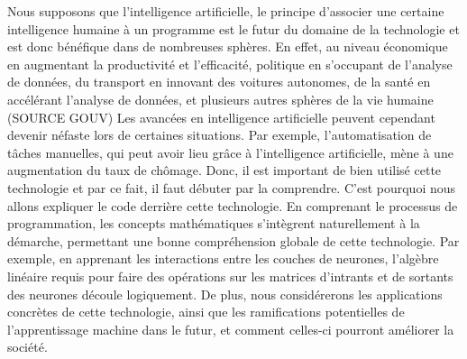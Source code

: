 Nous supposons que l’intelligence artificielle, le principe d’associer une certaine intelligence 
humaine à un programme est le futur du domaine de la technologie et est donc bénéfique dans de nombreuses
sphères. En effet, au niveau économique en augmentant la productivité et l’efficacité, politique en s’occupant
de l’analyse de données, du transport en innovant des voitures autonomes, de la santé en accélérant l’analyse de données,
et plusieurs autres sphères de la vie humaine (SOURCE GOUV) Les avancées en intelligence artificielle peuvent cependant 
devenir néfaste lors de certaines situations. Par exemple, l’automatisation de tâches manuelles, qui peut avoir lieu grâce
à l’intelligence artificielle,  mène à une augmentation du taux de chômage. Donc, il est important de bien utilisé cette technologie
et par ce fait, il faut débuter par la comprendre. C’est pourquoi nous allons expliquer le code derrière cette technologie.
En comprenant le processus de programmation, les concepts mathématiques s'intègrent naturellement à la démarche, permettant
une bonne compréhension globale de cette technologie. Par exemple, en apprenant les interactions entre les couches de neurones,
l'algèbre linéaire requis pour faire des opérations sur les matrices d'intrants et de sortants des neurones découle logiquement. 
De plus, nous considérerons les applications concrètes de cette technologie, ainsi que les ramifications potentielles de 
l'apprentissage machine dans le futur, et comment celles-ci pourront améliorer la société.

